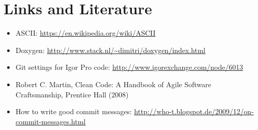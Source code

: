 \documentclass{scrartcl}
\begin{document}
\section{Links and Literature}
%
\begin{itemize}
	\item ASCII: \url{https://en.wikipedia.org/wiki/ASCII}
%
	\item Doxygen: \url{http://www.stack.nl/~dimitri/doxygen/index.html}
%
	\item Git settings for Igor Pro code: \url{http://www.igorexchange.com/node/6013}
%
	\item Robert C. Martin, Clean Code: A Handbook of Agile Software Craftsmanship, Prentice Hall (2008)
%
	\item How to write good commit messages: \url{http://who-t.blogspot.de/2009/12/on-commit-messages.html}
\end{itemize}
%
\end{document}
